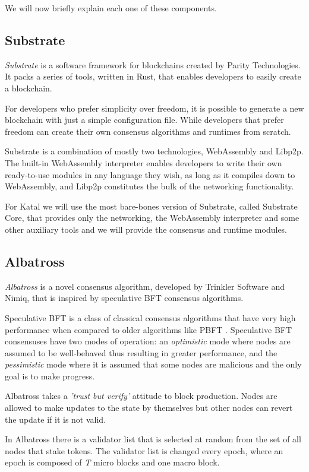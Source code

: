 \documentclass[conference]{IEEEtran}
\begin{document}
We will now briefly explain each one of these components.

\subsection{Substrate}
\textit{Substrate} is a software framework for blockchains created by Parity Technologies. It packs a series of tools, written in Rust, that enables developers to easily create a blockchain.

For developers who prefer simplicity over freedom, it is possible to generate a new blockchain with just a simple configuration file. While developers that prefer freedom can create their own consensus algorithms and runtimes from scratch.

Substrate is a combination of mostly two technologies, WebAssembly and Libp2p. The built-in WebAssembly interpreter enables developers to write their own ready-to-use modules in any language they wish, as long as it compiles down to WebAssembly, and Libp2p constitutes the bulk of the networking functionality.

For Katal we will use the most bare-bones version of Substrate, called Substrate Core, that provides only the networking, the WebAssembly interpreter and some other auxiliary tools and we will provide the consensus and runtime modules.

\subsection{Albatross}
\textit{Albatross} \cite{franca2019albatross} is a novel consensus algorithm, developed by Trinkler Software and Nimiq, that is inspired by speculative BFT consensus algorithms.

Speculative BFT is a class of classical consensus algorithms that have very high performance when compared to older algorithms like PBFT \cite{castro1999practical}. Speculative BFT consensuses have two modes of operation: an \textit{optimistic} mode where nodes are assumed to be well-behaved thus resulting in greater performance, and the \textit{pessimistic} mode where it is assumed that some nodes are malicious and the only goal is to make progress.

Albatross takes a \textit{'trust but verify'} attitude to block production. Nodes are allowed to make updates to the state by themselves but other nodes can revert the update if it is not valid.

In Albatross there is a validator list that is selected at random from the set of all nodes that stake tokens. The validator list is changed every epoch, where an epoch is composed of \textit{T} micro blocks and one macro block.
\end{document}
